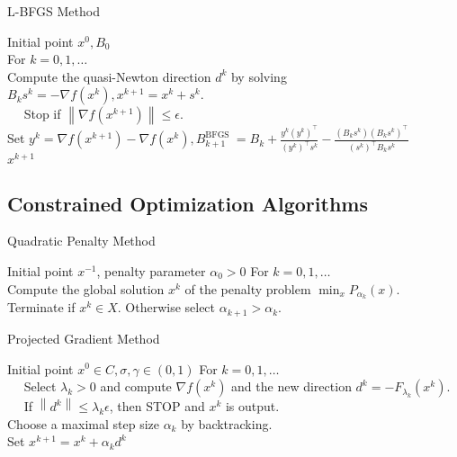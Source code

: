 \documentclass[11pt]{article}
\begin{document}
 \begin{algorithm}[H]
   \caption{L-BFGS Method}
   \label{alg:L-BFGS}
   \begin{algorithmic}[1]
   \REQUIRE
 Initial point $x^{0}, B_{0}$ \\
   \STATE For $k=0,1, \ldots$ \\
   \STATE Compute the quasi-Newton direction $d^{k}$ by solving $B_{k} s^{k}=-\nabla f\left(x^{k}\right), x^{k+1}=x^{k}+s^{k}$. \\
   \STATE $\quad$ Stop if $\left\|\nabla f\left(x^{k+1}\right)\right\| \leq \epsilon$. \\
   \STATE Set $y^{k}=\nabla f\left(x^{k+1}\right)-\nabla f\left(x^{k}\right), B_{k+1}^{\text {BFGS }}=B_{k}+\frac{y^{k}\left(y^{k}\right)^{\top}}{\left(y^{k}\right)^{\top} s^{k}}-\frac{\left(B_{k} s^{k}\right)\left(B_{k} s^{k}\right)^{\top}}{\left(s^{k}\right)^{\top} B_{k} s^{k}}$ \\
   \ENSURE $x^{k+1}$ \\
   \end{algorithmic}
 \end{algorithm}
 
\subsection{Constrained Optimization Algorithms}

\begin{algorithm}[H]
  \caption{Quadratic Penalty Method}
  \label{alg:Penalty}
  \begin{algorithmic}[1]
  \REQUIRE
  Initial point $x^{-1}$, penalty parameter $\alpha_{0}>0$
  \STATE For $k=0,1, \ldots$ \\
  \STATE Compute the global solution $x^{k}$ of the penalty problem $\min _{x} P_{\alpha_{k}}(x)$. \\     
  \ENSURE Terminate if $x^{k} \in X$. Otherwise select $\alpha_{k+1}>\alpha_{k}$.  
 \end{algorithmic}
 \end{algorithm} 






 \begin{algorithm}[H]
  \caption{Projected Gradient Method}
  \label{alg:Projected}
  \begin{algorithmic}[1]
  \REQUIRE
  Initial point $x^{0} \in C, \sigma, \gamma \in(0,1)$
  \STATE For $k=0,1, \ldots$ \\
  \STATE $\quad$ Select $\lambda_{k}>0$ and compute $\nabla f\left(x^{k}\right)$ and the new direction $d^{k}=-F_{\lambda_{k}}\left(x^{k}\right)$.  \\
  \STATE $\quad$ If $\left\|d^{k}\right\| \leq \lambda_{k} \epsilon$, then STOP and $x^{k}$ is output.  \\
  \STATE Choose a maximal step size $\alpha_{k}$ by backtracking. \\    
  \STATE Set $x^{k+1}=x^{k}+\alpha_{k} d^{k}$
 \end{algorithmic}
 \end{algorithm} 
\end{document}
